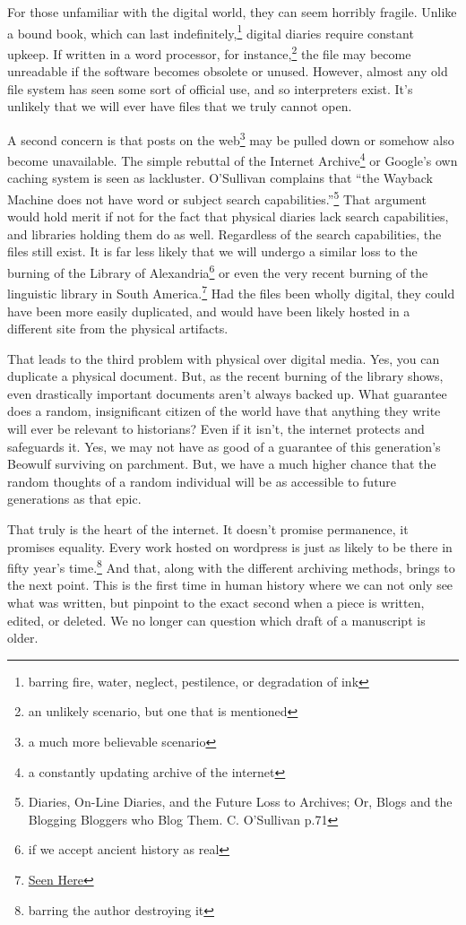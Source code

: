 \documentclass[12pt]{article}[titlepage]
\newcommand{\say}[1]{``#1''}
\newcommand{\1}{\={a}}
\newcommand{\2}{\={e}}
\newcommand{\3}{\={\i}}
\newcommand{\4}{\=o}
\newcommand{\5}{\=u}
\newcommand{\6}{\={A}}
\renewcommand{\,}{\textsuperscript{,}}
\begin{document}
For those unfamiliar with the digital world, they can seem horribly fragile.
Unlike a bound book, which can last indefinitely,\footnote{barring fire, water, neglect, pestilence, or degradation of ink} digital diaries require constant upkeep.
If written in a word processor, for instance,\footnote{an unlikely scenario, but one that is mentioned} the file may become unreadable if the software becomes obsolete or unused.
However, almost any old file system has seen some sort of official use, and so interpreters exist.
It’s unlikely that we will ever have files that we truly cannot open.

A second concern is that posts on the web\footnote{a much more believable scenario} may be pulled down or somehow also become unavailable.
The simple rebuttal of the Internet Archive\footnote{a constantly updating archive of the internet} or Google’s own caching system is seen as lackluster.
O’Sullivan complains that \say{the Wayback Machine does not have word or subject search capabilities.}\footnote{Diaries, On-Line Diaries, and the Future Loss to Archives; Or, Blogs and the Blogging Bloggers who Blog Them. C. O’Sullivan p.71}
That argument would hold merit if not for the fact that physical diaries lack search capabilities, and libraries holding them do as well.
Regardless of the search capabilities, the files still exist.
It is far less likely that we will undergo a similar loss to the burning of the Library of Alexandria\footnote{if we accept ancient history as real} or even the very recent burning of the linguistic library in South America.\footnote{\href{https://www.nationalgeographic.com/science/2018/09/news-museu-nacional-fire-rio-de-janeiro-natural-history/}{Seen Here}}
Had the files been wholly digital, they could have been more easily duplicated, and would have been likely hosted in a different site from the physical artifacts.

That leads to the third problem with physical over digital media.
Yes, you can duplicate a physical document.
But, as the recent burning of the library shows, even drastically important documents aren’t always backed up.
What guarantee does a random, insignificant citizen of the world have that anything they write will ever be relevant to historians?
Even if it isn’t, the internet protects and safeguards it.
Yes, we may not have as good of a guarantee of this generation’s Beowulf surviving on parchment.
But, we have a much higher chance that the random thoughts of a random individual will be as accessible to future generations as that epic.

That truly is the heart of the internet.
It doesn’t promise permanence, it promises equality.
Every work hosted on wordpress is just as likely to be there in fifty year’s time.\footnote{barring the author destroying it}
And that, along with the different archiving methods, brings to the next point.
This is the first time in human history where we can not only see what was written, but pinpoint to the exact second when a piece is written, edited, or deleted.
We no longer can question which draft of a manuscript is older.
\end{document}
